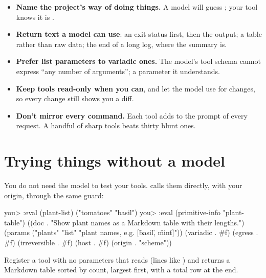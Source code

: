 \begin{tip}
\begin{itemize}
  \item \textbf{Name the project's way of doing things.} A model will guess
    ; your tool knows it is .
  \item \textbf{Return text a model can use}: an exit status first, then the
    output; a table rather than raw data; the end of a long log, where the
    summary is.
  \item \textbf{Prefer list parameters to variadic ones.} The model's tool
    schema cannot express ``any number of arguments''; a 
    parameter it understands.
  \item \textbf{Keep tools read-only when you can}, and let the model use
     for changes, so every change still shows you a diff.
  \item \textbf{Don't mirror every command.} Each tool adds to the prompt
    of every request. A handful of sharp tools beats thirty blunt ones.
\end{itemize}
\end{tip}

\section{Trying things without a model}

You do not need the model to test your tools.  calls them
directly, with your origin, through the same guard:

\begin{txt}
you> :eval (plant-list)
("tomatoes" "basil")
you> :eval (primitive-info "plant-table")
((doc . "Show plant names as a Markdown table with their lengths.")
 (params ("plants" "list" "plant names, e.g. [\"basil\", \"mint\"]"))
 (variadic . #f) (egress . #f) (irreversible . #f) (host . #f)
 (origin . "scheme"))
\end{txt}

\begin{puzzle}
Register a tool  with no parameters that reads
 (lines like ) and returns a Markdown
table sorted by count, largest first, with a total row at the end.
\end{puzzle}
